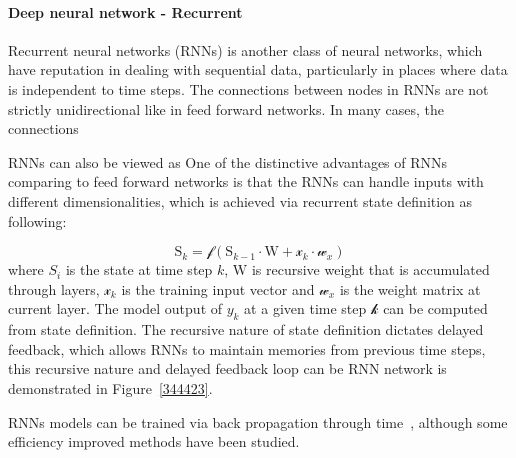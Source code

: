 \paragraph{Deep neural network - Recurrent}
Recurrent neural networks (RNNs) is another class of neural networks, which have reputation in dealing with sequential data, particularly in places where data is independent to time steps. The connections between nodes in RNNs are not strictly unidirectional like in feed forward networks. In many cases, the connections 
\par 
RNNs can also be viewed as One of the distinctive advantages of RNNs comparing to feed forward networks is that the RNNs can handle inputs with different dimensionalities, which is achieved via recurrent state definition as following:

\begin{equation}
    \mathrm{S}_k = \mathcal{f}(\mathrm{S}_{k-1} \cdot \mathrm{W} + \mathcal{x}_k \cdot \mathcal{w}_x)
\end{equation}
where $S_i$ is the state at time step $k$, $\mathrm{W}$ is recursive weight that is accumulated through layers, $\mathcal{x}_k$ is the training input vector and $\mathcal{w}_x$ is the weight matrix at current layer. The model output of $y_k$ at a given time step $\mathcal{k}$ can be computed from state definition. The recursive nature of state definition dictates delayed feedback, which allows RNNs to maintain memories from previous time steps, this recursive nature and delayed feedback loop can be  RNN network is demonstrated in Figure~\ref{344423}. 
\par 
RNNs models can be trained via back propagation through time~\cite{Goodfellow-et-al-2016}, although some efficiency improved methods have been studied.~\cite{963769,neco.1989,Gomez:2008:ANE:1390681.1390712}
